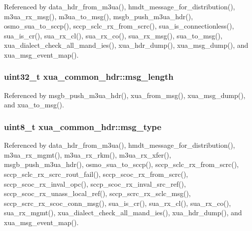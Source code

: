 Referenced by data\+\_\+hdr\+\_\+from\+\_\+m3ua(), hmdt\+\_\+message\+\_\+for\+\_\+distribution(), m3ua\+\_\+rx\+\_\+msg(), m3ua\+\_\+to\+\_\+msg(), msgb\+\_\+push\+\_\+m3ua\+\_\+hdr(), osmo\+\_\+sua\+\_\+to\+\_\+sccp(), sccp\+\_\+sclc\+\_\+rx\+\_\+from\+\_\+scrc(), sua\+\_\+is\+\_\+connectionless(), sua\+\_\+is\+\_\+cr(), sua\+\_\+rx\+\_\+cl(), sua\+\_\+rx\+\_\+co(), sua\+\_\+rx\+\_\+msg(), sua\+\_\+to\+\_\+msg(), xua\+\_\+dialect\+\_\+check\+\_\+all\+\_\+mand\+\_\+ies(), xua\+\_\+hdr\+\_\+dump(), xua\+\_\+msg\+\_\+dump(), and xua\+\_\+msg\+\_\+event\+\_\+map().

\subsubsection[{msg\+\_\+length}]{\setlength{\rightskip}{0pt plus 5cm}uint32\+\_\+t xua\+\_\+common\+\_\+hdr\+::msg\+\_\+length}\label{structxua__common__hdr_a1f9f74caadef5ee7f18ef42b66c8046e}


Referenced by msgb\+\_\+push\+\_\+m3ua\+\_\+hdr(), xua\+\_\+from\+\_\+msg(), xua\+\_\+msg\+\_\+dump(), and xua\+\_\+to\+\_\+msg().

\subsubsection[{msg\+\_\+type}]{\setlength{\rightskip}{0pt plus 5cm}uint8\+\_\+t xua\+\_\+common\+\_\+hdr\+::msg\+\_\+type}\label{structxua__common__hdr_a9496383cf791c651c616c873014dd368}


Referenced by data\+\_\+hdr\+\_\+from\+\_\+m3ua(), hmdt\+\_\+message\+\_\+for\+\_\+distribution(), m3ua\+\_\+rx\+\_\+mgmt(), m3ua\+\_\+rx\+\_\+rkm(), m3ua\+\_\+rx\+\_\+xfer(), msgb\+\_\+push\+\_\+m3ua\+\_\+hdr(), osmo\+\_\+sua\+\_\+to\+\_\+sccp(), sccp\+\_\+sclc\+\_\+rx\+\_\+from\+\_\+scrc(), sccp\+\_\+sclc\+\_\+rx\+\_\+scrc\+\_\+rout\+\_\+fail(), sccp\+\_\+scoc\+\_\+rx\+\_\+from\+\_\+scrc(), sccp\+\_\+scoc\+\_\+rx\+\_\+inval\+\_\+opc(), sccp\+\_\+scoc\+\_\+rx\+\_\+inval\+\_\+src\+\_\+ref(), sccp\+\_\+scoc\+\_\+rx\+\_\+unass\+\_\+local\+\_\+ref(), sccp\+\_\+scrc\+\_\+rx\+\_\+sclc\+\_\+msg(), sccp\+\_\+scrc\+\_\+rx\+\_\+scoc\+\_\+conn\+\_\+msg(), sua\+\_\+is\+\_\+cr(), sua\+\_\+rx\+\_\+cl(), sua\+\_\+rx\+\_\+co(), sua\+\_\+rx\+\_\+mgmt(), xua\+\_\+dialect\+\_\+check\+\_\+all\+\_\+mand\+\_\+ies(), xua\+\_\+hdr\+\_\+dump(), and xua\+\_\+msg\+\_\+event\+\_\+map().

